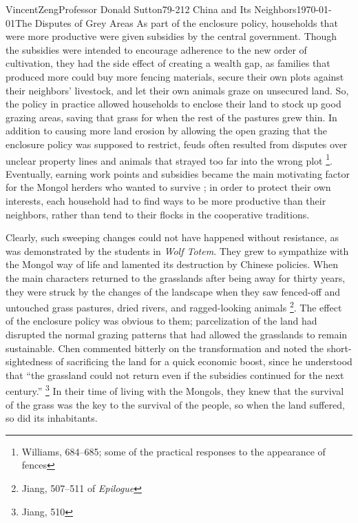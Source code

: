 \documentclass{article}[12pt]
\begin{document}
\begin{mla}{Vincent}{Zeng}{Professor Donald Sutton}{79-212 China and Its Neighbors}{\today}{The Disputes of Grey Areas}
	As part of the enclosure policy, households that were more productive
	were given subsidies by the central government. Though the subsidies
	were intended to encourage adherence to the new order of cultivation,
	they had the side effect of creating a wealth gap, as families that produced more could
	buy more fencing materials, secure their own plots against their
	neighbors' livestock, and let their own animals graze on unsecured
	land. So, the policy in practice allowed households to enclose their
	land to stock up good grazing areas, saving that grass for when the
	rest of the pastures grew thin. In addition to causing more land
	erosion by allowing the open grazing that the enclosure policy was
	supposed to restrict, feuds often resulted from disputes over unclear property lines and
	animals that strayed too far into the wrong plot \footnote{Williams, 684--685; some of the practical responses to the appearance of fences}.
	Eventually, earning work points and subsidies became the main motivating
	factor for the Mongol herders who wanted to survive
	; in order to protect
	their own interests, each household had to find ways to be more
	productive than their neighbors, rather than tend to their flocks in the cooperative traditions.

	Clearly, such sweeping changes could not have happened without resistance, as was
	demonstrated by the students in \textit{Wolf Totem}. They grew to sympathize
	with the Mongol way of life and lamented its destruction by Chinese
	policies. When the main characters returned to the grasslands after being
	away for thirty years, they were struck by the changes of the landscape when they saw
	fenced-off and untouched grass pastures, dried rivers, and
	ragged-looking animals \footnote{Jiang, 507--511 of \textit{Epilogue}}.
	The effect of the enclosure policy was obvious to them; parcelization of the
	land had disrupted the normal grazing patterns that had allowed the
	grasslands to remain sustainable. Chen commented bitterly on the
	transformation and noted the short-sightedness of sacrificing the land
	for a quick economic boost, since he understood that ``the grassland could not return even if
	the subsidies continued for the next century.'' \footnote{Jiang, 510} In their time  of living with the Mongols, they knew that the survival of the grass was the key to the survival of the people, so when the land suffered, so did its inhabitants.
	

\end{mla}
\end{document}
